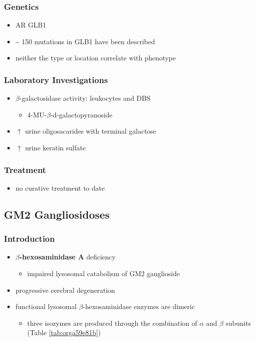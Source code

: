 \documentclass[12pt]{scrartcl}
\begin{document}
\subsubsection{Genetics}
\label{sec:org655f83b}
\begin{itemize}
\item AR GLB1
\item \textasciitilde{} 150 mutations in GLB1 have been described
\item neither the type or location correlate with phenotype
\end{itemize}
\subsubsection{Laboratory Investigations}
\label{sec:orgb286d3b}
\begin{itemize}
\item \(\beta\)-galactosidase activity: leukocytes and DBS
\begin{itemize}
\item 4-MU-\(\beta\)-d-galactopyranoside
\end{itemize}
\item \(\uparrow\) urine oligosacarides with terminal galactose
\item \(\uparrow\) urine keratin sulfate
\end{itemize}

\subsubsection{Treatment}
\label{sec:org418223f}
\begin{itemize}
\item no curative treatment to date
\end{itemize}
\subsection{GM2 Gangliosidoses}
\label{sec:org00cc898}
\subsubsection{Introduction}
\label{sec:org1e3087b}
\begin{itemize}
\item \textbf{\(\beta\)-hexosaminidase A} deficiency 
\begin{itemize}
\item impaired lysosomal catabolism of GM2 ganglioside
\end{itemize}
\item progressive cerebral degeneration
\item functional lysosomal \(\beta\)-hexosaminidase enzymes are dimeric
\begin{itemize}
\item three isozymes are produced through the combination of \(\alpha\)
and \(\beta\) subunits (Table \ref{tab:orga59e81b})
\end{itemize}
\end{itemize}
\end{document}
